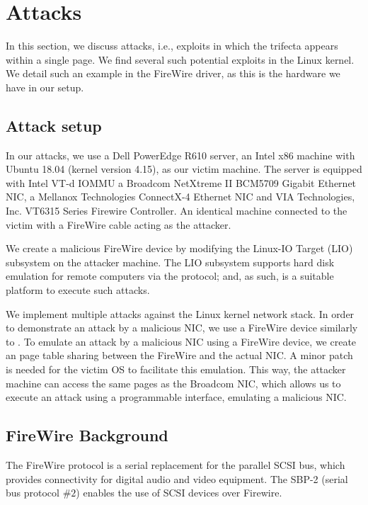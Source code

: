 \section{\simple{} Attacks}\label{sec:attack_setup}

In this section, we discuss \simple{} attacks, i.e., exploits in which the trifecta appears within a single page.
We find several such potential \simple{} exploits in the Linux kernel. We detail such an example in the FireWire driver, as this is the hardware we have in our setup. 



\subsection{Attack setup}
In our attacks, we use a Dell PowerEdge R610 server, an Intel x86 machine with Ubuntu 18.04 (kernel version 4.15), as our victim machine. The server is equipped with Intel VT-d IOMMU a Broadcom NetXtreme II BCM5709 Gigabit Ethernet NIC, a Mellanox Technologies ConnectX-4 Ethernet NIC and VIA Technologies, Inc. VT6315 Series Firewire Controller. An identical machine connected to the victim with a FireWire cable acting as the attacker. 

We create a malicious FireWire device by modifying the Linux-IO Target (LIO) subsystem on the attacker machine. The LIO subsystem supports hard disk emulation for remote computers via the \spb{} protocol; and, as such, is a suitable platform to execute such attacks. 

We implement multiple attacks against the Linux kernel network stack. In order to demonstrate an attack by a malicious NIC, we use a FireWire device similarly to \cite{SLND10}. To emulate an attack by a malicious NIC using a FireWire device, we create an \iova{} page table sharing between the FireWire and the actual NIC. A minor patch is needed for the victim OS to facilitate this emulation. This way, the attacker machine can access the same pages as the Broadcom NIC, which allows us to execute an attack using a programmable interface, emulating a malicious NIC.

\subsection{FireWire Background}

The FireWire protocol is a serial replacement for the parallel SCSI bus, which provides connectivity for digital audio and video equipment. The SBP-2 (serial bus protocol $\#2$) enables the use of SCSI devices over Firewire. 

